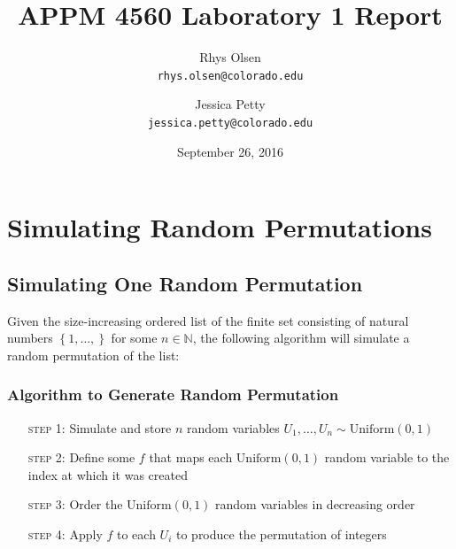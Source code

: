 \documentclass[11pt, oneside]{article}   	%
\title{APPM 4560 Laboratory 1 Report}
\author{Rhys Olsen\\
\texttt{rhys.olsen@colorado.edu}
 \and Jessica Petty\\
 \texttt{jessica.petty@colorado.edu}
 }
\date{September 26, 2016}
\begin{document}
\maketitle
\section{Simulating Random Permutations}
\subsection{Simulating One Random Permutation}

Given the size-increasing ordered list of the finite set consisting of natural numbers $\left\{1, \dots, \right\}$ for some $n \in \mathbb{N}$, the following algorithm will simulate a random permutation of the list:


\subsubsection{Algorithm to Generate Random Permutation}\label{sssec:perm}
\begin{enumerate}[leftmargin=30pt,labelindent=65pt,itemindent=30pt]
\item[\textsc{step 1:}] Simulate and store $n$ random variables $U_1, \dots, U_n \sim \text{Uniform}(0,1)$

\item[\textsc{step 2:}] Define some $f$ that maps each $\text{Uniform}\left(0,1 \right)$ random variable to the index at which it was created

\item[\textsc{step 3:}] Order the $\text{Uniform}\left(0,1 \right)$ random variables in decreasing order

\item[\textsc{step 4:}] Apply $f$ to each $U_i$ to produce the permutation of integers
\end{enumerate}
\end{document}
